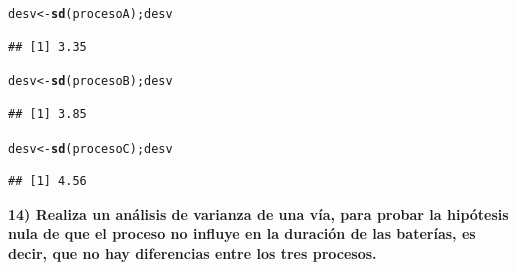 \documentclass[12pt,letterpaper]{article}\usepackage[]{graphicx}\usepackage[]{color}
\makeatletter
\newcommand{\hlstd}[1]{\textcolor[rgb]{0.345,0.345,0.345}{#1}}%
\newcommand{\hlkwb}[1]{\textcolor[rgb]{0.69,0.353,0.396}{#1}}%
\newcommand{\hlkwd}[1]{\textcolor[rgb]{0.737,0.353,0.396}{\textbf{#1}}}%
\newenvironment{kframe}{%
 \def\at@end@of@kframe{}%
 \ifinner\ifhmode%
  \def\at@end@of@kframe{\end{minipage}}%
  \begin{minipage}{\columnwidth}%
 \fi\fi%
 \def\FrameCommand##1{\hskip\@totalleftmargin \hskip-\fboxsep
 \colorbox{shadecolor}{##1}\hskip-\fboxsep
     \hskip-\linewidth \hskip-\@totalleftmargin \hskip\columnwidth}%
 \MakeFramed {\advance\hsize-\width
   \@totalleftmargin\z@ \linewidth\hsize
   \@setminipage}}%
 {\par\unskip\endMakeFramed%
 \at@end@of@kframe}
\newenvironment{knitrout}{}{} %
\makeatother
\begin{document}
\begin{knitrout}
\color{fgcolor}\begin{kframe}
\begin{alltt}
\hlstd{desv} \hlkwb{<-} \hlkwd{sd}\hlstd{(procesoA); desv}
\end{alltt}
\begin{verbatim}
## [1] 3.35
\end{verbatim}
\begin{alltt}
\hlstd{desv} \hlkwb{<-} \hlkwd{sd}\hlstd{(procesoB); desv}
\end{alltt}
\begin{verbatim}
## [1] 3.85
\end{verbatim}
\begin{alltt}
\hlstd{desv} \hlkwb{<-} \hlkwd{sd}\hlstd{(procesoC); desv}
\end{alltt}
\begin{verbatim}
## [1] 4.56
\end{verbatim}
\end{kframe}
\end{knitrout}
\textbf{14) Realiza un an\'alisis de varianza de una v\'ia, para probar la hip\'otesis nula de que el proceso no influye en la duraci\'on de las bater\'ias, es decir, que no hay diferencias entre los tres procesos.} 
\end{document}

